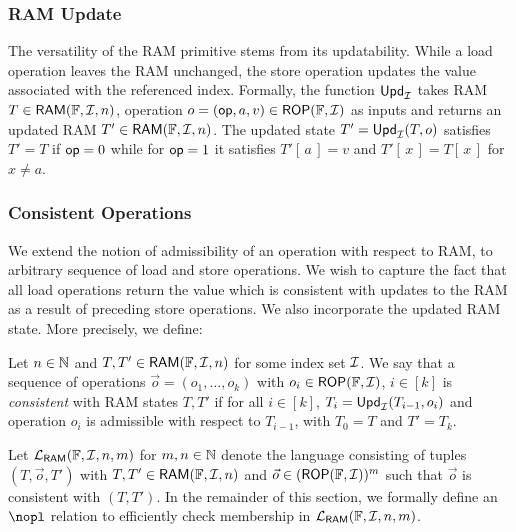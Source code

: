 \subsubsection{RAM Update}\label{subsec:ram-update}
The versatility of the RAM primitive stems from its updatability. While a load operation leaves the RAM unchanged, the store operation
updates the value associated with the referenced index. Formally, the function $\mathsf{Upd}_{\mathcal{I}}$ takes RAM $T\in \mathsf{RAM}(\mathbb{F}, \mathcal{I}, {n})$, operation
$o=(\mathsf{op},a,v)\in \mathsf{ROP}(\mathbb{F}, \mathcal{I})$ as inputs and returns an updated RAM $T'\in \mathsf{RAM}(\mathbb{F}, \mathcal{I}, {n})$. The updated state $T'=\mathsf{Upd}_{\mathcal{I}}(T,o)$ satisfies
$T'=T$ if $\mathsf{op}=0$ while for $\mathsf{op}=1$ it satisfies $T'[\,a\,]=v$  and $T'[\,x\,]=T[\,x\,]$ for $x\neq a$.

\subsubsection{Consistent Operations}\label{subsec:consistent-operations}
We extend the notion of admissibility of an operation with respect to RAM, to arbitrary sequence of load and store operations.
We wish to capture the fact that all load operations return the value which is consistent with updates to the RAM as a result of preceding
store operations. We also incorporate the updated RAM state. More precisely, we define:
\begin{definition}\label{defn:consistent-operations}
    Let $n\in \mathbb{N}$ and $T,T'\in \mathsf{RAM}(\mathbb{F}, \mathcal{I}, {n})$ for some index set $\mathcal{I}$. We say that a sequence of operations
    $\vec{o}=(o_1,\ldots,o_k)$ with $o_i\in \mathsf{ROP}(\mathbb{F}, \mathcal{I})$, $i\in [k]$ is {\em consistent} with RAM states
    $T,T'$ if for all $i\in [k]$, $T_{i}=\mathsf{Upd}_{\mathcal{I}}(T_{i-1},o_i)$ and operation $o_i$ is admissible with respect to $T_{i-1}$, with
    $T_0=T$ and $T'=T_k$.
\end{definition}

Let $\mathcal{L}_{\mathsf{RAM}}(\mathbb{F},\mathcal{I},n,m)$ for $m,n\in \mathbb{N}$ denote the language consisting of tuples $(T,\vec{o},T')$ with $T,T'\in \mathsf{RAM}(\mathbb{F}, \mathcal{I}, {n})$ and $\vec{o}\in (\mathsf{ROP}(\mathbb{F}, \mathcal{I}))^m$
such that $\vec{o}$ is consistent with $(T,T')$. In the remainder of this section, we formally define an $\nopl$ relation to efficiently
check membership in $\mathcal{L}_{\mathsf{RAM}}(\mathbb{F},\mathcal{I},n,m)$.

